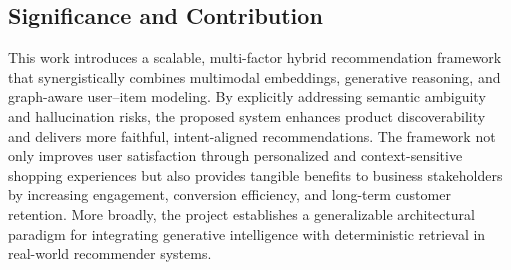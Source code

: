 \documentclass[conference]{IEEEtran}
\begin{document}
\subsection{Significance and Contribution}
This work introduces a scalable, multi-factor hybrid recommendation framework that synergistically combines multimodal embeddings, generative reasoning, and graph-aware user–item modeling. By explicitly addressing semantic ambiguity and hallucination risks, the proposed system enhances product discoverability and delivers more faithful, intent-aligned recommendations. The framework not only improves user satisfaction through personalized and context-sensitive shopping experiences but also provides tangible benefits to business stakeholders by increasing engagement, conversion efficiency, and long-term customer retention. More broadly, the project establishes a generalizable architectural paradigm for integrating generative intelligence with deterministic retrieval in real-world recommender systems.
\end{document}
